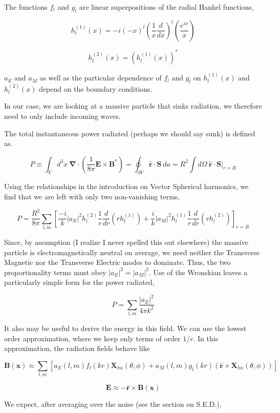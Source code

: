 \documentclass {article}
\renewcommand\vec{\mathbf}
\let\OldS\nabla
\renewcommand{\nabla}{\boldsymbol{\OldS}}
\let\OldHat\hat
\renewcommand{\hat}[1]{\OldHat{\mathbf{#1}}}
\begin{document}
The functions $f_l$ and $g_l$ are linear superpositions of the radial Hankel functions,

$$h_l^{(1)}(x) = -i (-x)^l \left(\frac 1 x \frac d {dx} \right)^l \left(\frac {e^{ix}} x \right)$$

$$h_l^{(2)}(x) = \left( h_l^{(1)}(x) \right)^*$$

\noindent $a_E$ and $a_M$ as well as the particular dependence of $f_l$ and $g_l$ on $h_l^{(1)}(x) $ and $h_l^{(2)}(x) $ depend on the boundary conditions.

In our case, we are looking at a massive particle that sinks radiation, we therefore need to only include incoming waves.

The total instantaneous power radiated (perhaps we should say sunk) is defined as.

$$P \equiv \int_V d^3x ~ \nabla \cdot \left( \frac 1 {8 \pi} \vec E \times \vec B^*\right) = \oint_{\partial V} \hat r \cdot \vec S ~ da = R^2 \int d\Omega ~ \hat r \cdot \vec S \bigg|_{r = R}$$

Using the relationships in the introduction on Vector Spherical harmonics, we find that we are left with only two non-vanishing terms,

$$P = \frac {R^2}{8 \pi} \sum_{l, m} \left[  \frac {-i} k |a_E|^2 h_l^{(2)} \frac 1 r \frac d {dr} \left( rh_l^{(1)} \right) + \frac i k |a_M|^2 h_l^{(1)} \frac 1 r \frac d {dr} \left( rh_l^{(2)}\right) \right]_{r=R}$$

Since, by assumption (I realize I never spelled this out elsewhere) the massive particle is electromagnetically neutral on average, we need neither the Transverse Magnetic nor the Transverse Electric modes to dominate. Thus, the two proportionality terms must obey $|a_E|^2 = |a_M|^2$. Use of the Wronskian leaves a particularly simple form for the power radiated,

$$P = \sum_{l,m} \frac {|a_E|^2} { 4 \pi k^2}$$

It also may be useful to derive the energy in this field. We can use the lowest order approximation, where we keep only terms of order $1/r$. In this approximation, the radiation fields behave like

$$\vec B (\vec x) \approx \sum_{l,m} \left[ a_E (l,m) f_l (kr) \vec X_{lm} (\theta, \phi) + a_M (l, m) g_l (kr) \left( \hat r \times \vec X_{lm} (\theta, \phi)  \right) \right]$$

$$ \vec E \approx - \hat r \times \vec B(\vec x) $$

We expect, after averaging over the noise (see the section on S.E.D.), 
\end{document}
